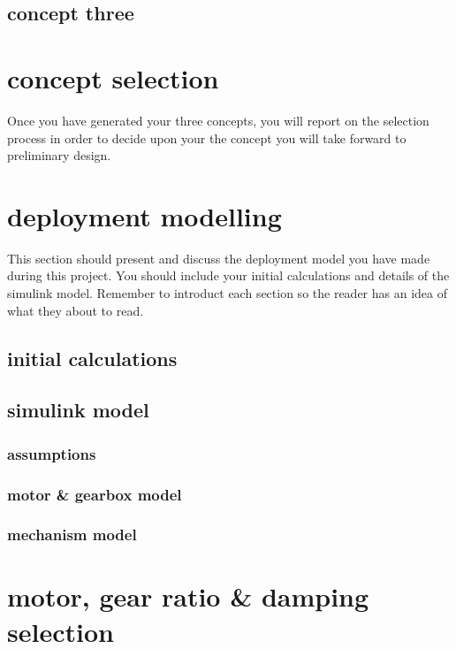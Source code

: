 \documentclass[11pt]{article}
\begin{document}
\subsection{concept three}

\section{concept selection}

Once you have generated your three concepts, you will report on the selection process in order to decide upon your the concept you will take forward to preliminary design.

\section{deployment modelling}

This section should present and discuss the deployment model you have made during this project. You should include your initial calculations and details of the simulink model. Remember to introduct each section so the reader has an idea of what they about to read.

\subsection{initial calculations}

\subsection{simulink model}

\subsubsection{assumptions}

\subsubsection{motor \& gearbox model}

\subsubsection{mechanism model}

\section{motor, gear ratio \& damping selection}
\end{document}
